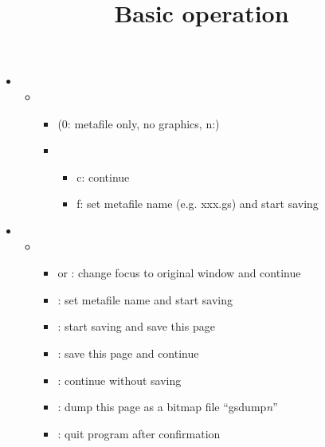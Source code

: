 \documentclass[12pt]{article}
\begin{document}
\title{Basic operation}
\begin{itemize}
\item
  \begin{itemize}
  \item
    \begin{itemize}
    \item
       (0: metafile only, no graphics, n:)
    \item
      \begin{itemize}
      \item
        c: continue
      \item
        f: set metafile name (e.g. xxx.gs) and start saving
      \end{itemize}
    \end{itemize}
  \end{itemize}
\item
  \begin{itemize}
  \item
    \begin{itemize}
    \item
       or : change focus to original window and continue
    \item
      : set metafile name and start saving
    \item
      : start saving and save this page
    \item
      : save this page and continue
    \item
      : continue without saving
    \item
      : dump this page as a bitmap file ``gsdump\textit{n}''
    \item
      : quit program after confirmation
    \end{itemize}
  \end{itemize}
\end{itemize}
  
\end{document}
